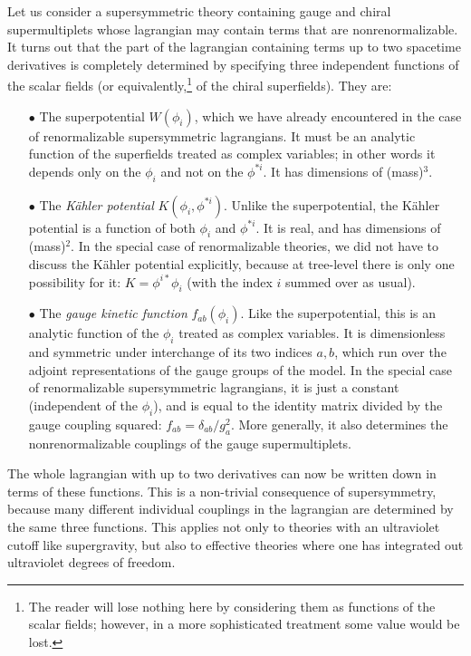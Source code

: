 Let us consider a supersymmetric theory containing gauge and chiral
supermultiplets whose lagrangian may contain terms that are
nonrenormalizable.
It turns out that the part of the lagrangian containing terms up to two
spacetime derivatives is completely
determined by
specifying
three independent functions of the scalar fields (or 
equivalently,\footnote{The reader will lose nothing here by considering
them as functions of the scalar fields;
however, in a more sophisticated treatment some value would be lost.}
of the chiral
superfields).
They are:
\begin{itemize}
\item[$\bullet$]
The superpotential $W(\phi_i)$, which we have already
encountered in the case of renormalizable
supersymmetric lagrangians.
It must be an analytic function
of the superfields treated as complex variables; in other words it
depends only on the $\phi_i$ and not on the $\phi^{* i}$. It has
dimensions of (mass)$^3$.
\item[$\bullet$]
The {\em K\"ahler potential} $K(\phi_{i},\phi^{*i})$.
Unlike the superpotential, the K\"ahler potential is a function
of both $\phi_i$ and $\phi^{* i}$. It is real, and has dimensions of
(mass)$^2$. In the special case
of renormalizable theories, we did not have to discuss the
K\"ahler potential explicitly, because at tree-level there is only one
possibility for
it: $K = \phi^{i*}\phi_i$ (with the index $i$ summed over as usual).
\item[$\bullet$]
The {\it gauge kinetic function} $f_{ab}(\phi_i)$. Like the
superpotential, this
is an analytic function of the $\phi_i$ treated as complex
variables. It is
dimensionless and symmetric under interchange of its two
indices $a,b$, which run over the adjoint representations of the
gauge groups of the model. In the special case of renormalizable
supersymmetric lagrangians, it is just a constant (independent of the
$\phi_i$), and is equal to the identity matrix divided by the gauge
coupling squared:
$f_{ab} = \delta_{ab}/g_a^2$.
More generally, it also determines the nonrenormalizable couplings of
the gauge supermultiplets.
\end{itemize}
The whole lagrangian with up to two derivatives can now be written
down in terms of these functions.
This is a non-trivial consequence of supersymmetry,
because many different individual couplings in the lagrangian are
determined by the same three functions. 
This applies not only to theories
with an ultraviolet cutoff like supergravity, but also to effective
theories where one has integrated out
ultraviolet degrees of freedom.


